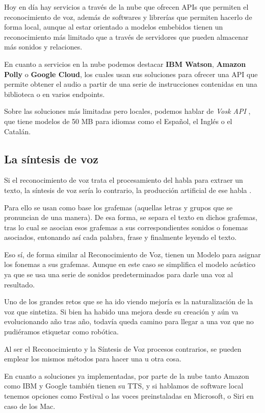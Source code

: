 Hoy en día hay servicios a través de la nube que ofrecen APIs que permiten el reconocimiento de voz, además de softwares y librerías que permiten hacerlo de forma local, aunque al estar orientado a modelos embebidos tienen un reconocimiento más limitado que a través de servidores que pueden almacenar más sonidos y relaciones.

En cuanto a servicios en la nube podemos destacar \textbf{IBM Watson}, \textbf{Amazon Polly} o \textbf{Google Cloud}, los cuales usan sus soluciones para ofrecer una API que permite obtener el audio a partir de una serie de instrucciones contenidas en una biblioteca o en varios endpoints.

Sobre las soluciones más limitadas pero locales, podemos hablar de \textit{Vosk API} \cite{vosk}, que tiene modelos de 50 MB para idiomas como el Español, el Inglés o el Catalán.


\subsection{La síntesis de voz}
Si el reconocimiento de voz trata el procesamiento del habla para extraer un texto, la síntesis de voz sería lo contrario, la producción artificial de ese habla \cite{tts-definition}. 

Para ello se usan como base los grafemas (aquellas letras y grupos que se pronuncian de una manera). De esa forma, se separa el texto en dichos grafemas, tras lo cual se asocian esos grafemas a sus correspondientes sonidos o fonemas asociados, entonando así cada palabra, frase y finalmente leyendo el texto.

Eso sí, de forma similar al Reconocimiento de Voz, tienen un Modelo para asignar los fonemas a sus grafemas. Aunque en este caso se simplifica el modelo acústico ya que se usa una serie de sonidos predeterminados para darle una voz al resultado.

Uno de los grandes retos que se ha ido viendo mejoría es la naturalización de la voz que sintetiza. Si bien ha habido una mejora desde su creación y aún va evolucionando año tras año, todavía queda camino para llegar a una voz que no pudiéramos etiquetar como robótica.

Al ser el Reconocimiento y la Síntesis de Voz procesos contrarios, se pueden emplear los mismos métodos para hacer una u otra cosa.

En cuanto a soluciones ya implementadas, por parte de la nube tanto Amazon como IBM y Google también tienen su TTS, y si hablamos de software local tenemos opciones como Festival o las voces preinstaladas en Microsoft, o Siri en caso de los Mac.
 

